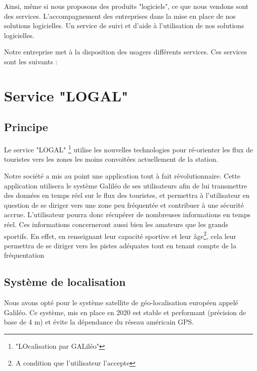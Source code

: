 {Ainsi, même si nous proposons des produits "logiciels", ce que nous vendons sont des services. L'accompagnement des entreprises dans la mise en place de nos solutions logicielles.
Un service de suivi et d'aide à l'utilisation de nos solutions logicielles.



Notre entreprise met à la disposition des usagers différents services. Ces services sont les suivants :

\section{Service "LOGAL"}

\subsection{Principe}

Le service "LOGAL" \footnote{"LOcalisation par GALiléo"} utilise les nouvelles technologies pour ré-orienter les flux de touristes vers les zones les moins convoitées actuellement de la station. \newline


Notre société a mis au point une application tout à fait révolutionnaire. Cette application utilisera le système Galiléo de ses utilisateurs afin de lui transmettre des données en temps réel sur le flux des touristes, et permettra à l’utilisateur en question de se diriger vers une zone peu fréquentée et contribuer à une sécurité accrue.\n
L'utilisateur pourra donc récupérer de nombreuses informations en temps réel. Ces informations concerneront aussi bien les amateurs que les grands sportifs.
En effet, en renseignant leur capacité sportive et leur âge\footnote{A condition que l'utilisateur l'accepte}, cela leur permettra de se diriger vers les pistes adéquates tout en tenant compte de la fréquentation




\newpage



\subsection{Système de localisation}

Nous avons opté pour le système satellite de géo-localisation européen appelé Galiléo. \newline 
Ce système, mis en place en 2020 est stable et performant (précision de base de 4 m) et évite la dépendance du réseau américain GPS.

}
